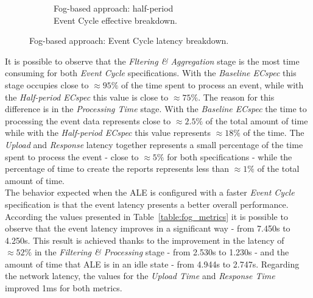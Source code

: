 \begin{figure}[ht!]
\begin{subfigure}{.5\textwidth}
    \caption{Fog-based approach: half-period\\Event Cycle effective breakdown.}
    \label{fig:ecspec_effective_half}
  \end{subfigure}
  \caption{Fog-based approach: Event Cycle latency breakdown.}
  \label{fig:ecspec_effective_breakdown}
\end{figure}

It is possible to observe that the \textit{Fltering \& Aggregation} stage is the most time consuming
for both \textit{Event Cycle} specifications. With the \textit{Baseline ECspec} this stage occupies
close to $\approx95\%$ of the time spent to process an event, while with the \textit{Half-period ECspec}
this value is close to $\approx75\%$. The reason for this difference is in the \textit{Processing Time} stage.
With the \textit{Baseline ECspec} the time to processing the event data represents close to $\approx2.5\%$
of the total amount of time while with the \textit{Half-period ECspec} this value represents $\approx18\%$
of the time. The \textit{Upload} and \textit{Response} latency together represents a small percentage of
the time spent to process the event - close to $\approx5\%$ for both specifications - while the percentage
of time to create the reports represents less than $\approx1\%$ of the total amount of time.\\

The behavior expected when the \gls{ALE} is configured with a faster \textit{Event Cycle} specification
is that the event latency presents a better overall performance. According the values presented in
Table~\ref{table:fog_metrics} it is possible to observe that the event latency improves in a significant
way - from 7.450s to 4.250s. This result is achieved thanks to the improvement in the latency
of $\approx52\%$ in the \textit{Filtering \& Processing} stage - from 2.530s to 1.230s - and the
amount of time that \gls{ALE} is in an idle state - from 4.944s to 2.747s. Regarding the network
latency, the values for the \textit{Upload Time} and \textit{Response Time} improved 1ms for both
metrics.\\

